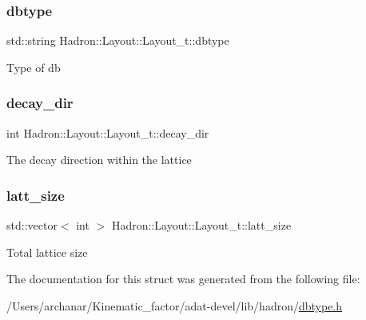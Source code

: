 \subsubsection{\texorpdfstring{dbtype}{dbtype}}
{\footnotesize\ttfamily std\+::string Hadron\+::\+Layout\+::\+Layout\+\_\+t\+::dbtype}

Type of db \mbox{\label{structHadron_1_1Layout_1_1Layout__t_aeb89b410154551d4dade862bf5a55955}} 
\subsubsection{\texorpdfstring{decay\_dir}{decay\_dir}}
{\footnotesize\ttfamily int Hadron\+::\+Layout\+::\+Layout\+\_\+t\+::decay\+\_\+dir}

The decay direction within the lattice \mbox{\label{structHadron_1_1Layout_1_1Layout__t_afa1541a7400b0f7d7967ff4d518e0a96}} 
\subsubsection{\texorpdfstring{latt\_size}{latt\_size}}
{\footnotesize\ttfamily std\+::vector$<$ int $>$ Hadron\+::\+Layout\+::\+Layout\+\_\+t\+::latt\+\_\+size}

Total lattice size 

The documentation for this struct was generated from the following file\+:\begin{DoxyCompactItemize}
\item 
/\+Users/archanar/\+Kinematic\+\_\+factor/adat-\/devel/lib/hadron/\mbox{\hyperlink{adat-devel_2lib_2hadron_2dbtype_8h}{dbtype.\+h}}\end{DoxyCompactItemize}

